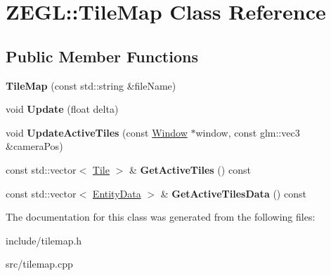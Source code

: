 \hypertarget{class_z_e_g_l_1_1_tile_map}{}\section{Z\+E\+G\+L\+:\+:Tile\+Map Class Reference}
\label{class_z_e_g_l_1_1_tile_map}
\subsection*{Public Member Functions}
\begin{DoxyCompactItemize}
\item 
\hypertarget{class_z_e_g_l_1_1_tile_map_a40036e023361a947e946214d6b5a8c05}{}{\bfseries Tile\+Map} (const std\+::string \&file\+Name)\label{class_z_e_g_l_1_1_tile_map_a40036e023361a947e946214d6b5a8c05}

\item 
\hypertarget{class_z_e_g_l_1_1_tile_map_a8eb181de4646c39a17f9fc82267d2bfe}{}void {\bfseries Update} (float delta)\label{class_z_e_g_l_1_1_tile_map_a8eb181de4646c39a17f9fc82267d2bfe}

\item 
\hypertarget{class_z_e_g_l_1_1_tile_map_abad39ce2b672a79d6ce52145aaa7672c}{}void {\bfseries Update\+Active\+Tiles} (const \hyperlink{class_z_e_g_l_1_1_window}{Window} $\ast$window, const glm\+::vec3 \&camera\+Pos)\label{class_z_e_g_l_1_1_tile_map_abad39ce2b672a79d6ce52145aaa7672c}

\item 
\hypertarget{class_z_e_g_l_1_1_tile_map_ae52f183a2710f7dc2835fbc02ea3a81c}{}const std\+::vector$<$ \hyperlink{class_z_e_g_l_1_1_tile}{Tile} $>$ \& {\bfseries Get\+Active\+Tiles} () const \label{class_z_e_g_l_1_1_tile_map_ae52f183a2710f7dc2835fbc02ea3a81c}

\item 
\hypertarget{class_z_e_g_l_1_1_tile_map_a49f94f1a578a4a25fb15bf1dfde1ab26}{}const std\+::vector$<$ \hyperlink{struct_z_e_g_l_1_1_entity_data}{Entity\+Data} $>$ \& {\bfseries Get\+Active\+Tiles\+Data} () const \label{class_z_e_g_l_1_1_tile_map_a49f94f1a578a4a25fb15bf1dfde1ab26}

\end{DoxyCompactItemize}


The documentation for this class was generated from the following files\+:\begin{DoxyCompactItemize}
\item 
include/tilemap.\+h\item 
src/tilemap.\+cpp\end{DoxyCompactItemize}
